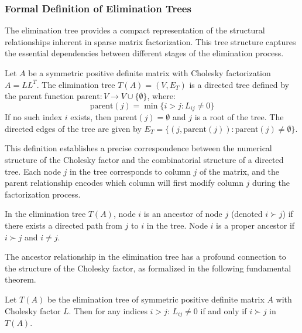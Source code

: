 \subsubsection{Formal Definition of Elimination Trees}
The elimination tree provides a compact representation of the structural relationships inherent in sparse matrix factorization. This tree structure captures the essential dependencies between different stages of the elimination process.

\begin{definition}
Let $A$ be a symmetric positive definite matrix with Cholesky factorization $A = LL^T$. The elimination tree $T(A) = (V, E_T)$ is a directed tree defined by the parent function $\text{parent}: V \to V \cup \{\emptyset\}$, where:
\begin{equation}
    \text{parent}(j) = \min\{i > j : L_{ij} \neq 0\}
\end{equation}
If no such index $i$ exists, then $\text{parent}(j) = \emptyset$ and $j$ is a root of the tree. The directed edges of the tree are given by $E_T = \{(j, \text{parent}(j)) : \text{parent}(j) \neq \emptyset\}$.
\end{definition}

This definition establishes a precise correspondence between the numerical structure of the Cholesky factor and the combinatorial structure of a directed tree. Each node $j$ in the tree corresponds to column $j$ of the matrix, and the parent relationship encodes which column will first modify column $j$ during the factorization process.

\begin{definition}
In the elimination tree $T(A)$, node $i$ is an ancestor of node $j$ (denoted $i \succ j$) if there exists a directed path from $j$ to $i$ in the tree. Node $i$ is a proper ancestor if $i \succ j$ and $i \neq j$.
\end{definition}

The ancestor relationship in the elimination tree has a profound connection to the structure of the Cholesky factor, as formalized in the following fundamental theorem.

\begin{theorem}
Let $T(A)$ be the elimination tree of symmetric positive definite matrix $A$ with Cholesky factor $L$. Then for any indices $i > j$: $L_{ij} \neq 0$ if and only if $i \succ j$ in $T(A)$.
\end{theorem}

